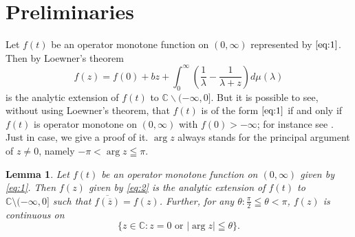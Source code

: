 \documentclass[10pt,a4paper]{amsart}
\newtheorem{lemma}[theorem]{Lemma}
\begin{document}
\section{Preliminaries}
Let $f(t)$ be an operator monotone function on $(0, \infty)$ represented by 
$\eqref{eq:1}$. Then by Loewner's theorem 
\begin{equation}
f(z) = f(0) + b z + \int_0^{\infty} (\frac{1}{\lambda} - \frac{1}{\lambda + z}) d\mu(\lambda) \label{eq:2}
\end{equation}
 is the analytic extension of $f(t)$ to $\mathbb{C} \smallsetminus (-\infty, 0]$. 
But it is possible to see, without using Loewner's theorem,  that $f(t)$ is of the 
form $\eqref{eq:1}$ if and only if 
$f(t)$ is operator monotone on $(0, \infty)$ with $f(0)>-\infty$; for instance see \cite{Hansen}. 
Just in case, we give a proof of it.
$\arg z$ always stands for the principal argument of $z\ne 0$, namely 
$-\pi < \arg z \leqq \pi$.
\begin{lemma}\label{Lem:2-1} Let $f(t)$ be an operator monotone function on $(0, \infty)$ given 
by \eqref{eq:1}. Then 
$f(z)$ given by \eqref{eq:2} is the analytic extension of $f(t)$ to 
$\mathbb{C}\setminus (-\infty, 0]$ such that $\overline{f(\overline{z})} = f(z)$.
 Further, 
for any $\theta: \frac{\pi}{2} \leqq \theta < \pi$, 
$f(z)$ is continuous 
on $$\{ z \in \mathbb{C}: z=0\,\, \text{or}\,\, |\arg z| \leqq \theta \}.$$
\end{lemma}
\end{document}

